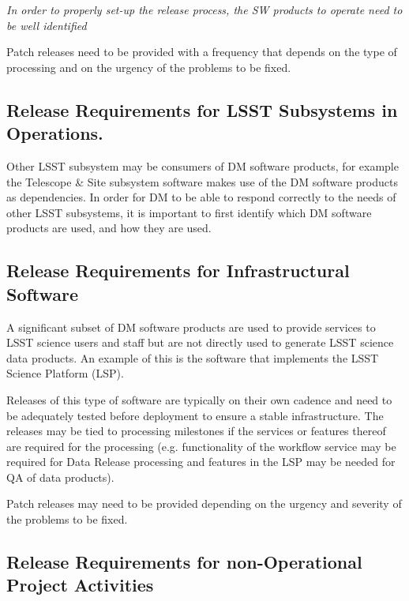 \textit{In order to properly set-up the release process, the \gls{SW} products to operate need to be well identified}

Patch releases need to be provided with a frequency that depends on the type of processing
and on the urgency of the problems to be fixed.


\subsection{Release Requirements for \gls{LSST} Subsystems in Operations.} \label{sec:otherreqs}

Other \gls{LSST} subsystem may be consumers of \gls{DM} software products, for example the Telescope \& Site subsystem software makes use of the \gls{DM} software products as dependencies. 
In order for \gls{DM} to be able to respond correctly to the needs of other \gls{LSST} subsystems, it is important to first identify which \gls{DM} software products are used, and how they are used.


\subsection{Release Requirements for Infrastructural Software} \label{sec:infreqs}

A significant subset of \gls{DM} software products are used to provide services to \gls{LSST} science users and staff but are not directly used to generate \gls{LSST} science data products. An example of this is the software that implements the \gls{LSST} Science Platform (\gls{LSP}).

Releases of this type of software are typically on their own cadence and need to be adequately tested before deployment to ensure a stable infrastructure. The releases may be tied to processing milestones if the services or features thereof are required for the processing (e.g. functionality of the workflow service may be required for Data Release processing and features in the \gls{LSP} may be needed for \gls{QA} of data products).

Patch releases may need to be provided depending on the urgency and severity of the problems to be fixed.


\subsection{Release Requirements for non-Operational Project Activities} \label{sec:nonopsreqs}

